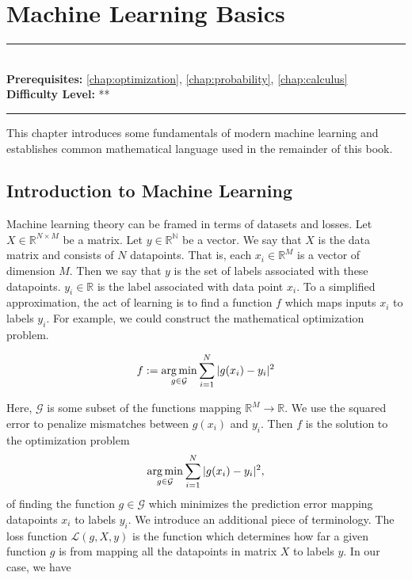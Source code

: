 \documentclass[book.tex]{subfiles}
\begin{document}
\chapter{Machine Learning Basics}
\label{ch:background}

\label{chap:ml_basics}
\noindent\rule{11cm}{0.4pt} \\
\textbf{Prerequisites:} \autoref{chap:optimization}, \autoref{chap:probability}, 
\autoref{chap:calculus} \\
\textbf{Difficulty Level:} ** \\
\noindent\rule{11cm}{0.4pt}
\vspace{5mm}

This chapter introduces some fundamentals of modern machine learning and establishes common mathematical language used in the remainder of this book.


\section{Introduction to Machine Learning}

Machine learning theory can be framed in terms of datasets and losses. Let $X \in \mathbb{R}^{N\times M}$ be a matrix. Let $y \in \mathbb{R^N}$ be a vector. We say that $X$ is the data matrix and consists of $N$ datapoints. That is, each $x_i \in \mathbb{R}^M$ is a vector of dimension $M$. Then we say that $y$ is the set of labels associated with these datapoints. $y_i \in \mathbb{R}$ is the label associated with data point $x_i$. To a simplified approximation, the act of learning is to find a function $f$ which maps inputs $x_i$ to labels $y_i$. For example, we could construct the mathematical optimization problem.

\begin{align}
f := \operatorname*{arg\,min}_{g \in \mathcal{G}} \sum_{i=1}^N |g(x_i) - y_i|^2 
\end{align}

Here, $\mathcal{G}$ is some subset of the functions mapping $\mathbb{R}^M \to \mathbb{R}$. We use the squared error to penalize mismatches between $g(x_i)$ and $y_i$. Then $f$ is the solution to the optimization problem
\begin{align}
\operatorname*{arg\,min}_{g \in \mathcal{G}} \sum_{i=1}^N |g(x_i) - y_i|^2,
\end{align}
of finding the function $g \in \mathcal{G}$ which minimizes the prediction error mapping datapoints $x_i$ to labels $y_i$. We introduce an additional piece of terminology. The loss function $\mathcal{L}(g, X, y)$ is the function which determines how far a given function $g$ is from mapping all the datapoints in matrix $X$ to labels $y$. In our case, we have
\end{document}
